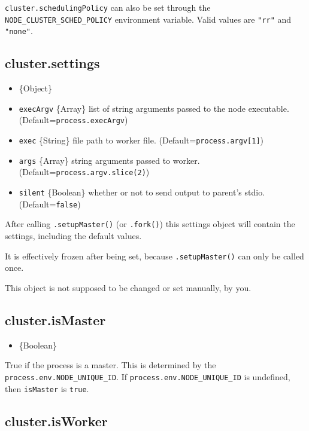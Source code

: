 \texttt{cluster.schedulingPolicy} can also be set through the
\texttt{NODE\_CLUSTER\_SCHED\_POLICY} environment variable. Valid values
are \texttt{"rr"} and \texttt{"none"}.

\subsection{cluster.settings}\label{cluster.settings}

\begin{itemize}
\itemsep1pt\parskip0pt
\item
  \{Object\}
\item
  \texttt{execArgv} \{Array\} list of string arguments passed to the
  node executable. (Default=\texttt{process.execArgv})
\item
  \texttt{exec} \{String\} file path to worker file.
  (Default=\texttt{process.argv{[}1{]}})
\item
  \texttt{args} \{Array\} string arguments passed to worker.
  (Default=\texttt{process.argv.slice(2)})
\item
  \texttt{silent} \{Boolean\} whether or not to send output to parent's
  stdio. (Default=\texttt{false})
\end{itemize}

After calling \texttt{.setupMaster()} (or \texttt{.fork()}) this
settings object will contain the settings, including the default values.

It is effectively frozen after being set, because
\texttt{.setupMaster()} can only be called once.

This object is not supposed to be changed or set manually, by you.

\subsection{cluster.isMaster}\label{cluster.ismaster}

\begin{itemize}
\itemsep1pt\parskip0pt
\item
  \{Boolean\}
\end{itemize}

True if the process is a master. This is determined by the
\texttt{process.env.NODE\_UNIQUE\_ID}. If
\texttt{process.env.NODE\_UNIQUE\_ID} is undefined, then
\texttt{isMaster} is \texttt{true}.

\subsection{cluster.isWorker}\label{cluster.isworker}

